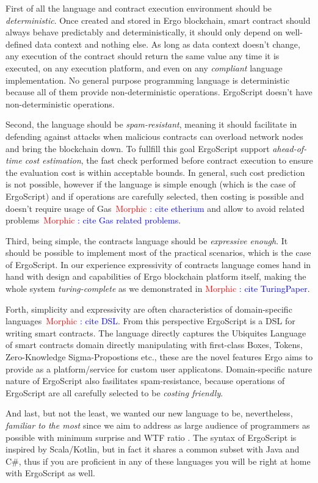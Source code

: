 \documentclass[11pt]{article}
\newcommand{\authnote}[2]{\textsf{#1 \textcolor{blue}{: #2}}}
\newcommand{\mnote}[1]{{\authnote{\textcolor{red}{Morphic}}{#1}}}
\begin{document}
First of all the language and contract execution environment should be
\emph{deterministic}. Once created and stored in Ergo blockchain, smart
contract should always behave predictably and deterministically, it should only depend on well-defined data context and nothing else. 
As long as data context doesn't change, any execution of the contract
should return the same value any time it is executed, on any execution
platform, and even on any \emph{compliant} language implementation.
No general purpose programming language is deterministic because
all of them provide non-deterministic operations. ErgoScript doesn't have
non-deterministic operations.

Second, the language should be \emph{spam-resistant}, meaning it should
facilitate in defending against attacks when malicious contracts can overload
network nodes and bring the blockchain down. To fullfill this goal ErgoScript
support \emph{ahead-of-time cost estimation}, the fast check performed before
contract execution to ensure the evaluation cost is within acceptable
bounds. In general, such cost prediction is not possible, however if the
language is simple enough (which is the case of ErgoScript) and if operations
are carefully selected, then costing is possible and doesn't require 
usage of Gas~\mnote{cite etherium} and allow to avoid related problems~\mnote{cite Gas related problems}.

Third, being simple, the contracts language should be \emph{expressive
enough}. It should be possible to implement most of the practical scenarios,
which is the case of ErgoScript. In our experience expressivity of contracts
language comes hand in hand with design and capabilities of Ergo blockchain
platform itself, making the whole system \emph{turing-complete} as we
demonstrated in \mnote{cite TuringPaper}.

Forth, simplicity and expressivity are often characteristics of
domain-specific languages~\mnote{cite DSL}. From this perspective ErgoScript
is a DSL for writing smart contracts. The language directly captures the
Ubiquites Language~\cite{UbiqLang} of smart contracts
domain directly manipulating with first-class Boxes, Tokens, Zero-Knowledge
Sigma-Propostions etc., these are the novel features Ergo aims to provide as a platform/service
for custom user applicatons. Domain-specific nature nature of ErgoScript also fasilitates spam-resistance,
because operations of ErgoScript are all carefully selected to be \emph{costing
friendly}.

And last, but not the least, we wanted our new language to be, nevertheless,
\emph{familiar to the most} since we aim to address as large audience of
programmers as possible with minimum surprise and WTF ratio
\cite{WTFLang}.
The syntax of ErgoScript is inspired by Scala/Kotlin, but in fact it shares a
common subset with Java and C\#, thus if you are proficient in any of these
languages you will be right at home with ErgoScript as well.
\end{document}
